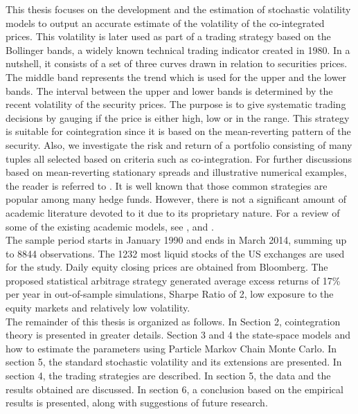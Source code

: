 \documentclass[11pt,a4,twosided,singlespacing,titlepagenumber=on]{scrreprt}
\numberwithin{equation}{chapter} %
\theoremstyle{remark}
\begin{document}
This thesis focuses on the development and the estimation of stochastic volatility models to output an accurate estimate of the volatility of the co-integrated prices. This volatility is later used as part of a trading strategy based on the Bollinger bands, a widely known technical trading indicator created in 1980. In a nutshell, it consists of a set of three curves drawn in relation to securities prices. The middle band represents the trend which is used for the upper and the lower bands. The interval between the upper and lower bands is determined by the recent volatility of the security prices. The purpose is to give systematic trading decisions by gauging if the price is either high, low or in the range. This strategy is suitable for cointegration since it is based on the mean-reverting pattern of the security. Also, we investigate the risk and return of a portfolio consisting of many tuples all selected based on criteria such as co-integration. For further discussions based on mean-reverting stationary spreads and illustrative numerical examples, the reader is referred to \cite{vidyamurthy2004}.  It is well known that those common strategies are popular among many hedge funds. However, there is not a significant amount of academic literature devoted to it due to its proprietary nature. For a review of some of the existing academic models, see \cite{gatev2006}, \cite{perlin2009} and \cite{broussard2012}. \\

The sample period starts in January 1990 and ends in March 2014, summing up to 8844 observations. The 1232 most liquid stocks of the US exchanges are used for the study. Daily equity closing prices are obtained from Bloomberg. The proposed statistical arbitrage strategy generated average excess returns of 17\% per year in out-of-sample simulations, Sharpe Ratio of 2, low exposure to the equity markets and relatively low volatility. \\


The remainder of this thesis is organized as follows. In Section 2, cointegration theory is presented in greater details. Section 3 and 4 the state-space models and how to estimate the parameters using Particle Markov Chain Monte Carlo. In section 5, the standard stochastic volatility and its extensions are presented. In section 4, the trading strategies are described. In section 5, the data and the results obtained are discussed. In section 6, a conclusion based on the empirical results is presented, along with suggestions of future research.
\end{document}
